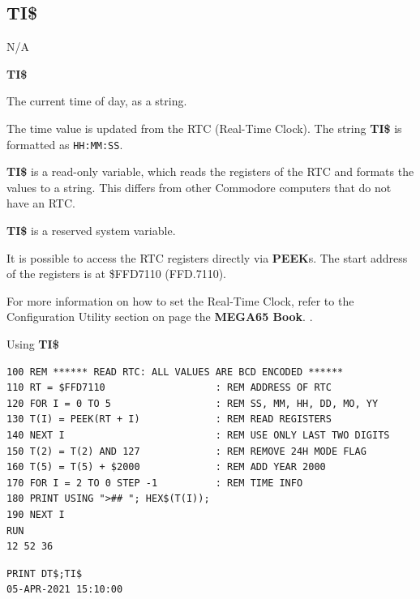\subsection{TI\$}
\begin{description}[leftmargin=2cm,style=nextline]
\item [Token:]    N/A

\item [Format:]   {\bf TI\$}

\item [Usage:]    The current time of day, as a string.

                  The time value is updated from the RTC (Real-Time Clock). The string {\bf TI\$} is formatted as \texttt{HH:MM:SS}.

                  {\bf TI\$} is a read-only variable, which reads the registers of the RTC and formats the values to a string. This differs from other Commodore computers that do not have an RTC.

\item [Remarks:]  {\bf TI\$} is a reserved system variable.

                  It is possible to access the RTC registers directly via {\bf PEEK}s. The start address of the registers is at \$FFD7110 (FFD.7110).

                  For more information on how to set the Real-Time Clock, refer to the Configuration Utility section on page \ifdefined\printmanual
                     the {\bf MEGA65 Book}.
                  \else
                     .
                  \fi

\item [Examples:] Using {\bf TI\$}

\begin{tcolorbox}[colback=black,coltext=white]
\verbatimfont{\codefont}
\begin{verbatim}
100 REM ****** READ RTC: ALL VALUES ARE BCD ENCODED ******
110 RT = $FFD7110                   : REM ADDRESS OF RTC
120 FOR I = 0 TO 5                  : REM SS, MM, HH, DD, MO, YY
130 T(I) = PEEK(RT + I)             : REM READ REGISTERS
140 NEXT I                          : REM USE ONLY LAST TWO DIGITS
150 T(2) = T(2) AND 127             : REM REMOVE 24H MODE FLAG
160 T(5) = T(5) + $2000             : REM ADD YEAR 2000
170 FOR I = 2 TO 0 STEP -1          : REM TIME INFO
180 PRINT USING ">## "; HEX$(T(I));
190 NEXT I
RUN
12 52 36
\end{verbatim}
\end{tcolorbox}

\begin{tcolorbox}[colback=black,coltext=white]
\verbatimfont{\codefont}
\begin{verbatim}
PRINT DT$;TI$
05-APR-2021 15:10:00
\end{verbatim}
\end{tcolorbox}
\end{description}

